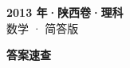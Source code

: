 \documentclass[zihao=-4, a4paper]{ctexart}
\begin{document}
\begin{center}
  {\Large\bfseries 2013 年·陕西卷·理科}\\[4pt]
  {\large 数学 · 简答版}
\end{center}
\medskip
{}

\clearpage
{}
\begin{center}{\Large\bfseries 答案速查}\end{center}
\medskip

\end{document}
